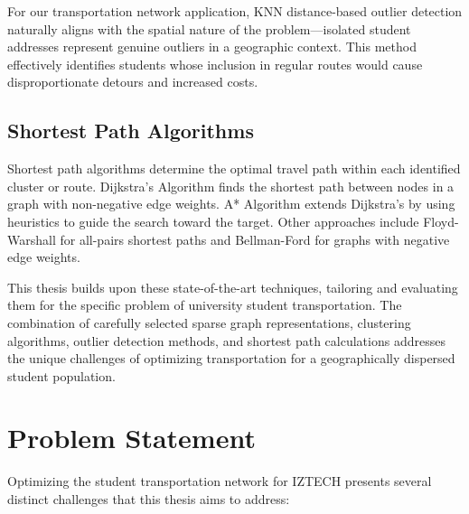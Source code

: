 For our transportation network application, KNN distance-based outlier detection naturally aligns with the spatial nature of the problem—isolated student addresses represent genuine outliers in a geographic context. This method effectively identifies students whose inclusion in regular routes would cause disproportionate detours and increased costs.

\subsection{Shortest Path Algorithms}
Shortest path algorithms determine the optimal travel path within each identified cluster or route. Dijkstra's Algorithm \cite{dijkstra1959note} finds the shortest path between nodes in a graph with non-negative edge weights. A* Algorithm \cite{hart1968formal} extends Dijkstra's by using heuristics to guide the search toward the target. Other approaches include Floyd-Warshall \cite{floyd1962algorithm} for all-pairs shortest paths and Bellman-Ford \cite{bellman1958routing} for graphs with negative edge weights.

This thesis builds upon these state-of-the-art techniques, tailoring and evaluating them for the specific problem of university student transportation. The combination of carefully selected sparse graph representations, clustering algorithms, outlier detection methods, and shortest path calculations addresses the unique challenges of optimizing transportation for a geographically dispersed student population.

\section{Problem Statement}
\label{sec:intro_problems}
Optimizing the student transportation network for IZTECH presents several distinct challenges that this thesis aims to address:

